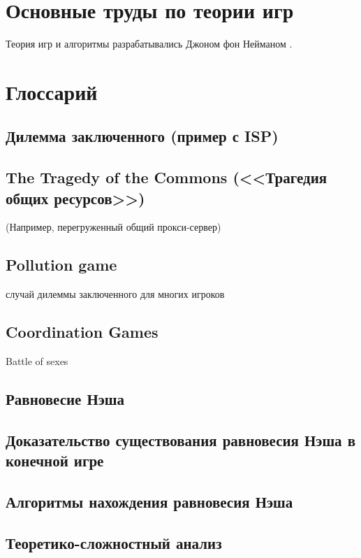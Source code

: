 \documentclass[a4paper,12pt]{article}
\begin{document}
\section{Основные труды по теории игр}
Теория игр и алгоритмы разрабатывались Джоном фон Нейманом \cite{neumann}.

\section{Глоссарий}

\subsection{Дилемма заключенного (пример с ISP)}

\subsection{The Tragedy of the Commons (<<Трагедия общих ресурсов>>)}
(Например, перегруженный общий прокси-сервер)

\subsection{Pollution game}
случай дилеммы заключенного для многих игроков

\subsection{Coordination Games}
Battle of sexes

\subsection{Равновесие Нэша}

\subsection{Доказательство существования равновесия Нэша в конечной игре}

\subsection{Алгоритмы нахождения равновесия Нэша}

\subsection{Теоретико-сложностный анализ}
\end{document}

